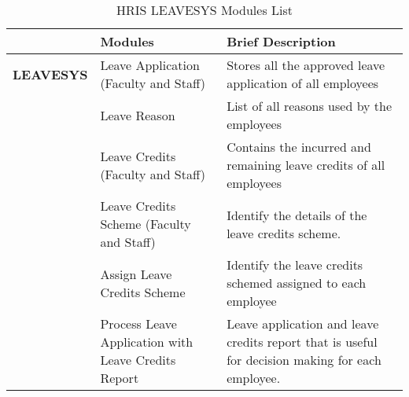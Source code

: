 \begin{table}[H]
\begin{tabular}{@{}p{2cm}p{3.5cm}p{9cm}@{}}
\toprule
\multicolumn{1}{l}{} & \textbf{Modules}                                    & \textbf{Brief Description}                                                                       \\ \midrule
\textbf{LEAVESYS}    & Leave Application (Faculty and Staff)               & Stores all the approved leave application of all employees                                       \\
                        & Leave Reason                                        & List of all reasons used by the employees                                                        \\
                        & Leave Credits (Faculty and Staff)                   & Contains the incurred and remaining leave credits of all employees                               \\
                        & Leave Credits Scheme (Faculty and Staff)            & Identify the details of the leave credits scheme.                                                \\
                        & Assign Leave Credits Scheme                         & Identify the leave credits schemed assigned to each employee                                     \\
                        & Process Leave Application with Leave Credits Report & Leave application and leave credits report that is useful for decision making for each employee. \\ \bottomrule
\end{tabular}
\caption{HRIS LEAVESYS Modules List}
\label{tab:hris-leavesys-modules}
\end{table}

